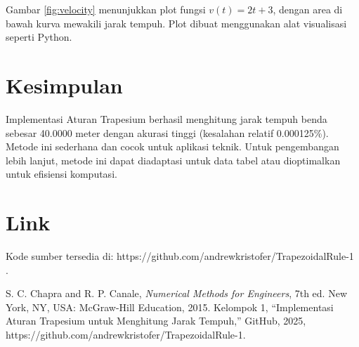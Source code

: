 \documentclass[conference]{IEEEtran}
\begin{document}
Gambar \ref{fig:velocity} menunjukkan plot fungsi \( v(t) = 2t + 3 \), dengan area di bawah kurva mewakili jarak tempuh. Plot dibuat menggunakan alat visualisasi seperti Python.

\section{Kesimpulan}
Implementasi Aturan Trapesium berhasil menghitung jarak tempuh benda sebesar 40.0000 meter dengan akurasi tinggi (kesalahan relatif 0.000125\%). Metode ini sederhana dan cocok untuk aplikasi teknik. Untuk pengembangan lebih lanjut, metode ini dapat diadaptasi untuk data tabel atau dioptimalkan untuk efisiensi komputasi.

\section{Link}
Kode sumber tersedia di: https://github.com/andrewkristofer/TrapezoidalRule-1 \cite{b2}.

\begin{thebibliography}{00}
 S. C. Chapra and R. P. Canale, \textit{Numerical Methods for Engineers}, 7th ed. New York, NY, USA: McGraw-Hill Education, 2015.
 Kelompok 1, ``Implementasi Aturan Trapesium untuk Menghitung Jarak Tempuh,'' GitHub, 2025, https://github.com/andrewkristofer/TrapezoidalRule-1.
\end{thebibliography}
\end{document}
